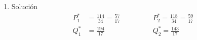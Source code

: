 \begin{ejercicio}
\begin{enumerate}
\begin{equation}
\begin{aligned}
            P_1^* &= \frac{(a_2 - b_2)(\alpha_0 - \beta_0) - (a_0 - b_0)(\alpha_2 - \beta_2)}{(a_1 - b_1)(\alpha_2 - \beta_2) - (a_2 - b_2)(\alpha_1 - \beta_1)} \\
            P_2^* &= \frac{(a_0 - b_0)(\alpha_1 - \beta_1) - (a_1 - b_1)(\alpha_0 - \beta_0)}{(a_1 - b_1)(\alpha_2 - \beta_2) - (a_2 - b_2)(\alpha_1 - \beta_1)}
        \end{aligned}
        \end{equation}
        \item Solución
        \begin{equation}
            \begin{aligned}
                P_1^* &= \frac{114}{34} = \frac{57}{17} \qquad \quad &&P_2^* = \frac{118}{34}=\frac{59}{17} \\
                Q_1^* &= \frac{194}{17}  \qquad \quad &&Q_2^* = \frac{143}{17}
            \end{aligned}
        \end{equation}
    \end{enumerate}
\end{ejercicio}





